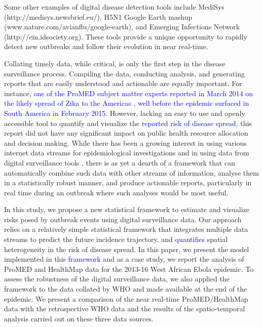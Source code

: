 \documentclass[9pt,twocolumn,twoside,lineno]{pnas-new}
\newcommand{\sangeeta}[1]{\textcolor{blue}{#1}}
\begin{document}
Some other examples of digital disease detection tools include MediSys
(http://medisys.newsbrief.eu/), H5N1 Google Earth mashup
(www.nature.com/avianflu/google-earth), and Emerging Infections Network
(http://ein.idsociety.org). These tools provide a unique opportunity to
rapidly detect new outbreaks and follow their evolution in near
real-time.

Collating timely data, while critical, is only the first step in the
disease surveillance process. Compiling the data, conducting analysis,
and generating reports that are easily understood and actionable are
equally important. For instance, \sangeeta{one of the ProMED subject matter experts
 reported in March 2014 on the likely spread of Zika to the Americas 
\cite{promedzika}, well before the epidemic surfaced in South
America in February 2015.} However, lacking an easy to use and openly
accessible tool to quantify and visualize the \sangeeta{reported risk of
  disease spread}, this report did not have any significant impact on public health resource
allocation and decision making. While there has been a growing interest
in using various internet data streams for epidemiological
investigations \cite{generous2014global, milinovich2015role} and
in using data from digital surveillance tools
\cite{chowell2016elucidating}, there is as yet a dearth of a framework
that can automatically combine such data with other streams of
information, analyse them in a statistically robust manner, and produce
actionable reports, particularly in real time during an outbreak where
such analyses would be most useful.

In this study, we propose a new statistical framework to estimate and
visualize risks posed by outbreak events using digital surveillance
data. Our approach relies on a relatively simple statistical framework
that integrates multiple data streams to predict the future incidence
trajectory, and \sangeeta{quantifies} spatial heterogeneity in the risk of disease
spread. In this paper, we present the model implemented in this \sangeeta{framework}
and as a case study, we report the analysis of ProMED and HealthMap data
for the 2013-16 West African Ebola epidemic. To assess the robustness of
the digital surveillance data, we also applied the framework to the data
collated by WHO and made available at
the end of the epidemic. We present a comparison of the near real-time
ProMED/HealthMap data with the retrospective WHO data and the results of
the spatio-temporal analysis carried out on these three data sources.
\end{document}
